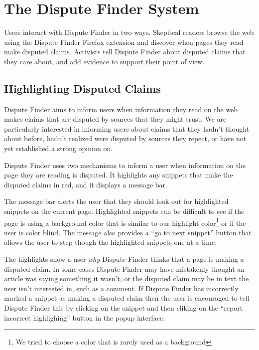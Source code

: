\documentclass{www2010-submission}
\begin{document}
% 



\section{The Dispute Finder System}

Users interact with Dispute Finder in two ways. Skeptical readers browse the web using the Dispute Finder Firefox extension and discover when pages they read make disputed claims. Activists tell Dispute Finder about disputed claims that they care about, and add evidence to support their point of view.


\subsection{Highlighting Disputed Claims}

Dispute Finder aims to inform users when information they read on the web makes claims that are disputed by sources that they might trust. We are particularly interested in informing users about claims that they hadn't thought about before, hadn't realized were disputed by sources they repect, or have not yet established a strong opinion on.

Dispute Finder uses two mechanisms to inform a user when information on the page they are reading is disputed. It highlights any snippets that make the disputed claims in red, and it displays a message bar.

The message bar alerts the user that they should look out for highlighted snippets on the current page. 
Highlighted snippets can be difficult to see if the page is using a background color that is similar to our highlight color\footnote{We tried to choose a color that is rarely used as a background} or if the user is color blind. The message also provides a ``go to next snippet'' button that allows the user to step though the highlighted snippets one at a time.

The highlights show a user {\it why} Dispute Finder thinks that a page is making a disputed claim. In some cases Dispute Finder may have mistakenly thought an article was saying something it wasn't, or the disputed claim may be in text the user isn't interested in, such as a comment. If Dispute Finder has incorrectly marked a snippet as making a disputed claim then the user is encouraged to tell Dispute Finder this by clicking on the snippet and then cliking on the ``report incorrect highlighing'' button in the popup interface.
\end{document}
